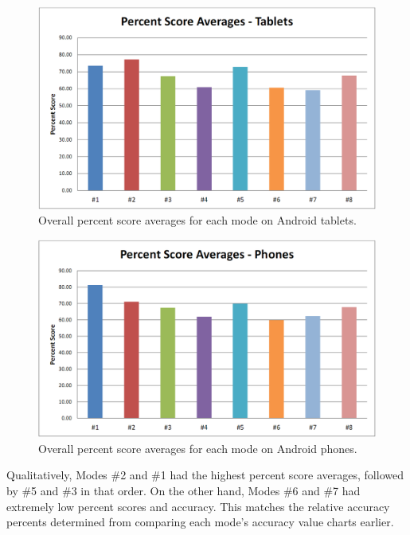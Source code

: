 \documentclass{sig-alternate}
\begin{document}
\begin{figure}[htb!]
	\begin{center}
		\includegraphics[width=1\linewidth]{figure_chart_score_tablet}
	\end{center}
	\vspace{-12pt}
	\caption{Overall percent score averages for each mode on Android tablets.}
	\label{fig:chart_score_tablet}
\end{figure}

\begin{figure}[htb!]
	\begin{center}
		\includegraphics[width=1\linewidth]{figure_chart_score_phone}
	\end{center}
	\vspace{-12pt}
	\caption{Overall percent score averages for each mode on Android phones.}
	\label{fig:chart_score_phone}
\end{figure}

Qualitatively, Modes \#2 and \#1 had the highest percent score averages, followed by \#5 and \#3 in that order. On the other hand, Modes \#6 and \#7 had extremely low percent scores and accuracy. This matches the relative accuracy percents determined from comparing each mode's accuracy value charts earlier.\\
\end{document}
